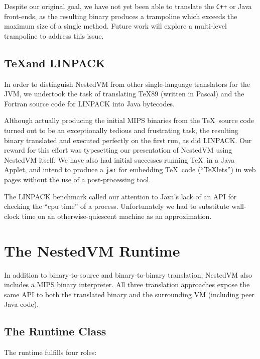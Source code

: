 \documentclass{acmconf}
\begin{document}
Despite our original goal, we have not yet been able to translate the
{\tt C++} or Java front-ends, as the resulting binary produces a
trampoline which exceeds the maximum size of a single method.  Future
work will explore a multi-level trampoline to address this issue.



\subsection{\TeX and LINPACK}

In order to distinguish NestedVM from other single-language
translators for the JVM, we undertook the task of translating \TeX 89
(written in Pascal) and the Fortran source code for LINPACK into Java
bytecodes.

Although actually producing the initial MIPS binaries from the \TeX\
source code turned out to be an exceptionally tedious and frustrating
task, the resulting binary translated and executed perfectly on the
first run, as did LINPACK.  Our reward for this effort was typesetting
our presentation of NestedVM using NestedVM itself.  We have also had
initial successes running \TeX\ in a Java Applet, and intend to
produce a {\tt jar} for embedding \TeX\ code (``\TeX lets'') in web
pages without the use of a post-processing tool.

The LINPACK benchmark called our attention to Java's lack of an API
for checking the ``cpu time'' of a process.  Unfortunately we had to
substitute wall-clock time on an otherwise-quiescent machine as an
approximation.



\section{The NestedVM Runtime}

In addition to binary-to-source and binary-to-binary translation,
NestedVM also includes a MIPS binary interpreter.  All three
translation approaches expose the same API to both the translated
binary and the surrounding VM (including peer Java code).

\subsection{The Runtime Class}

The runtime fulfills four roles:
\end{document}
